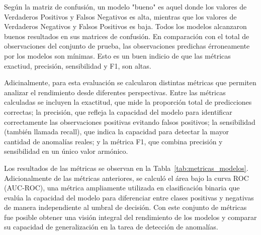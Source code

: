 \documentclass[11pt,a4paper,spanish]{book}
\numberwithin{equation}{chapter}
\numberwithin{figure}{chapter}
\begin{document}
Según la matriz de confusión, un modelo "bueno" es aquel donde los valores de Verdaderos Positivos
y Falsos Negativos es alta, mientras que los valores de Verdaderos Negativos y Falsos Positivos es
baja. 
Todos los modelos alcanzaron buenos resultados en sus matrices de confusión. En comparación con el
total de observaciones del conjunto de prueba, las observaciones predichas érroneamente por los
modelos son mínimas. Esto es un buen indicio de que las métricas exactiud, precisión, sensibilidad
y F1, son altas. 


Adicinalmente, para esta evaluación se calcularon 
distintas métricas que permiten analizar el rendimiento desde diferentes perspectivas. 
Entre las métricas calculadas se incluyen la exactitud, que mide la proporción total de 
predicciones correctas; la precisión, que refleja la capacidad del modelo para 
identificar correctamente las observaciones positivas evitando falsos positivos; 
la sensibilidad (también llamada recall), que indica la capacidad para detectar la 
mayor cantidad de anomalías reales; y la métrica F1, que combina precisión y 
sensibilidad en un único valor armónico.


Los resultados de las métricas se observan en  
la Tabla~\ref{tab:metricas_modelos}. 
Adicionalmente de las métricas anteriores, se calculó el área bajo la curva ROC (AUC-ROC), 
una métrica 
ampliamente utilizada en clasificación binaria que evalúa la capacidad del modelo para 
diferenciar entre clases positivas y negativas de manera independiente al umbral de 
decisión. Con este conjunto de métricas fue posible obtener una visión integral del 
rendimiento de los modelos y comparar su capacidad de generalización en la tarea de 
detección de anomalías. 
\end{document}
